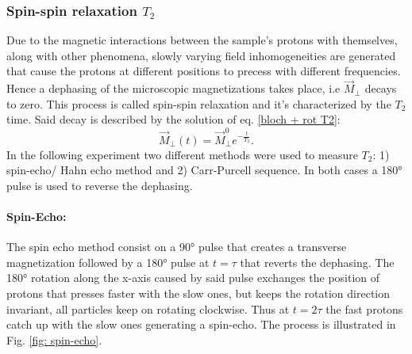  \subsubsection{Spin-spin relaxation $T_2$}
Due to the magnetic interactions between the sample's protons with themselves, along with other phenomena, slowly varying field inhomogeneities are generated that cause
the protons at different positions to precess with different frequencies. Hence a dephasing of the microscopic magnetizations takes place, i.e $\vec{M}_\perp$ decays to zero. This process is called spin-spin relaxation and it's characterized by the $T_2$ time. Said decay is described by the solution of eq. \ref{bloch + rot T2}:
\begin{equation}
\label{eq: sol. bloch T2}
\vec{M}_{\perp}(t)= \vec{M}_\perp^{0}e^{-\frac{t}{T_2}}.
\end{equation}
In the following experiment two different methods were used to measure $T_2$: 1) spin-echo/ Hahn echo method and 2) Carr-Purcell sequence. In both cases a 180° pulse is used to reverse the dephasing. 
\paragraph{Spin-Echo:}
The spin echo method consist on a 90° pulse that creates a transverse magnetization followed by a 180° pulse at $t = \tau$ that reverts the dephasing. The 180° rotation along the x-axis caused by said pulse exchanges the position of protons that presses faster with the
 slow ones, but keeps the rotation direction invariant, all particles keep on rotating clockwise. Thus at $t = 2\tau$ the fast protons catch up with the slow ones generating a spin-echo. The process is illustrated in Fig. \ref{fig: spin-echo}. 
 
